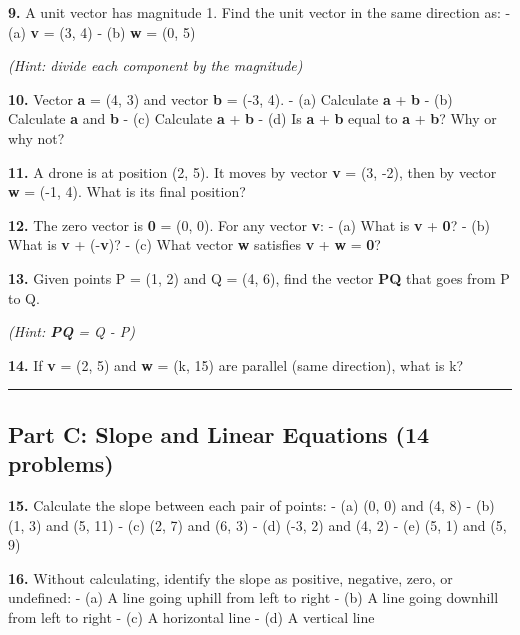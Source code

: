 \documentclass[
  11pt,
]{article}
\begin{document}
\textbf{9.} A unit vector has magnitude 1. Find the unit vector in the
same direction as: - (a) \textbf{v} = (3, 4) - (b) \textbf{w} = (0, 5)

\emph{(Hint: divide each component by the magnitude)}

\textbf{10.} Vector \textbf{a} = (4, 3) and vector \textbf{b} = (-3, 4).
- (a) Calculate \textbf{a} + \textbf{b} - (b) Calculate
\textbar{}\textbf{a}\textbar{} and \textbar{}\textbf{b}\textbar{} - (c)
Calculate \textbar{}\textbf{a} + \textbf{b}\textbar{} - (d) Is
\textbar{}\textbf{a} + \textbf{b}\textbar{} equal to
\textbar{}\textbf{a}\textbar{} + \textbar{}\textbf{b}\textbar? Why or
why not?

\textbf{11.} A drone is at position (2, 5). It moves by vector
\textbf{v} = (3, -2), then by vector \textbf{w} = (-1, 4). What is its
final position?

\textbf{12.} The zero vector is \textbf{0} = (0, 0). For any vector
\textbf{v}: - (a) What is \textbf{v} + \textbf{0}? - (b) What is
\textbf{v} + (-\textbf{v})? - (c) What vector \textbf{w} satisfies
\textbf{v} + \textbf{w} = \textbf{0}?

\textbf{13.} Given points P = (1, 2) and Q = (4, 6), find the vector
\textbf{PQ} that goes from P to Q.

\emph{(Hint: \textbf{PQ} = Q - P)}

\textbf{14.} If \textbf{v} = (2, 5) and \textbf{w} = (k, 15) are
parallel (same direction), what is k?

\begin{center}\rule{0.5\linewidth}{0.5pt}\end{center}

\hypertarget{part-c-slope-and-linear-equations-14-problems}{%
\subsection{Part C: Slope and Linear Equations (14
problems)}\label{part-c-slope-and-linear-equations-14-problems}}

\textbf{15.} Calculate the slope between each pair of points: - (a) (0,
0) and (4, 8) - (b) (1, 3) and (5, 11) - (c) (2, 7) and (6, 3) - (d)
(-3, 2) and (4, 2) - (e) (5, 1) and (5, 9)

\textbf{16.} Without calculating, identify the slope as positive,
negative, zero, or undefined: - (a) A line going uphill from left to
right - (b) A line going downhill from left to right - (c) A horizontal
line - (d) A vertical line
\end{document}
